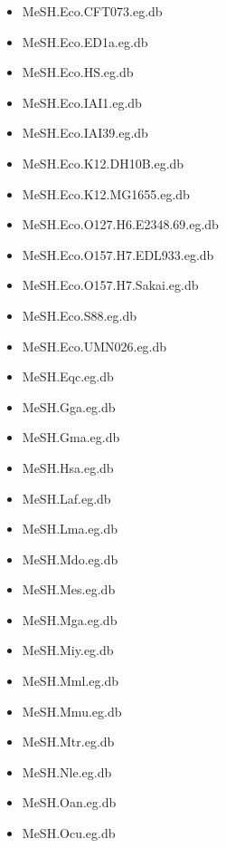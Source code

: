 \documentclass[margin,line,10pt]{res}
\newenvironment{list1}{
  \begin{list}{\ding{113}}{%
      \setlength{\itemsep}{0in}
      \setlength{\parsep}{0in} \setlength{\parskip}{0in}
      \setlength{\topsep}{0in} \setlength{\partopsep}{0in} 
      \setlength{\leftmargin}{0.17in}}}{\end{list}}
\begin{document}
\begin{resume}
\begin{list1}
\begin{multicols}{2}
\begin{itemize}
\item MeSH.Eco.CFT073.eg.db
\item MeSH.Eco.ED1a.eg.db 
\item MeSH.Eco.HS.eg.db
\item MeSH.Eco.IAI1.eg.db 
\item MeSH.Eco.IAI39.eg.db 
\item MeSH.Eco.K12.DH10B.eg.db
\item MeSH.Eco.K12.MG1655.eg.db
\item MeSH.Eco.O127.H6.E2348.69.eg.db
\item MeSH.Eco.O157.H7.EDL933.eg.db 
\item MeSH.Eco.O157.H7.Sakai.eg.db
\item MeSH.Eco.S88.eg.db
\item MeSH.Eco.UMN026.eg.db
\item MeSH.Eqc.eg.db 
\item MeSH.Gga.eg.db
\item MeSH.Gma.eg.db 
\item MeSH.Hsa.eg.db
\item MeSH.Laf.eg.db 
\item MeSH.Lma.eg.db 
\item MeSH.Mdo.eg.db 
\item MeSH.Mes.eg.db 
\item MeSH.Mga.eg.db 
\item MeSH.Miy.eg.db 
\item MeSH.Mml.eg.db 
\item MeSH.Mmu.eg.db 
\item MeSH.Mtr.eg.db 
\item MeSH.Nle.eg.db 
\item MeSH.Oan.eg.db 
\item MeSH.Ocu.eg.db 

\end{itemize}
\end{multicols}
\end{list1}
\end{resume}
\end{document}
